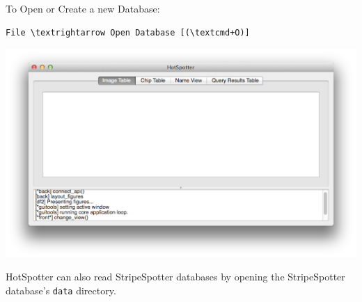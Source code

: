 \documentclass[a4paper,10pt]{article}
\begin{document}
    \renewcommand{\textrightarrow}{$\rightarrow$}
    \newcommand{\textcmd}{\cmdkey}

    To Open or Create a new Database: \\
    \begin{Verbatim}[commandchars=\\\{\}]
    File \textrightarrow Open Database [(\textcmd+O)]
    \end{Verbatim}

    \begin{center}
        \includegraphics[scale=0.15]{images/start.png}
    \end{center}

    HotSpotter can also read StripeSpotter databases by opening the
    StripeSpotter database's {\tt data} directory.
    
\end{document}
